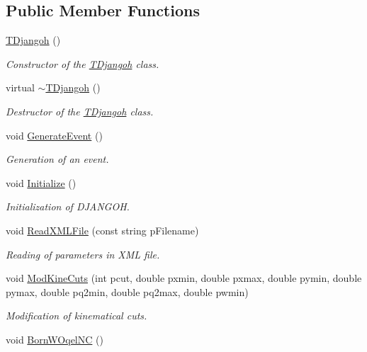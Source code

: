 \subsection*{Public Member Functions}
\begin{DoxyCompactItemize}
\item 
\hyperlink{class_t_djangoh_a7cbbb76ddc4fe82e25bb1e58078e45bc}{T\+Djangoh} ()
\begin{DoxyCompactList}\small\item\em Constructor of the \hyperlink{class_t_djangoh}{T\+Djangoh} class. \end{DoxyCompactList}\item 
virtual \hyperlink{class_t_djangoh_abee806f1e4536b30624590e34869f0e0}{$\sim$\+T\+Djangoh} ()
\begin{DoxyCompactList}\small\item\em Destructor of the \hyperlink{class_t_djangoh}{T\+Djangoh} class. \end{DoxyCompactList}\item 
void \hyperlink{class_t_djangoh_a121effe35c3f3ac168a4663bcd5eef5c}{Generate\+Event} ()
\begin{DoxyCompactList}\small\item\em Generation of an event. \end{DoxyCompactList}\item 
void \hyperlink{class_t_djangoh_a763cae78834404166df26ccd059bb301}{Initialize} ()
\begin{DoxyCompactList}\small\item\em Initialization of D\+J\+A\+N\+G\+OH. \end{DoxyCompactList}\item 
void \hyperlink{class_t_djangoh_af6954bed103bc5adc60822f16268c12d}{Read\+X\+M\+L\+File} (const string p\+Filename)
\begin{DoxyCompactList}\small\item\em Reading of parameters in X\+ML file. \end{DoxyCompactList}\item 
void \hyperlink{class_t_djangoh_a20fbc4c9736f639e6211333c6113421a}{Mod\+Kine\+Cuts} (int pcut, double pxmin, double pxmax, double pymin, double pymax, double pq2min, double pq2max, double pwmin)
\begin{DoxyCompactList}\small\item\em Modification of kinematical cuts. \end{DoxyCompactList}\item 
void \hyperlink{class_t_djangoh_acbf402e049af75c65f28589178eb1487}{Born\+W\+Oqel\+NC} ()

\end{DoxyCompactItemize}

